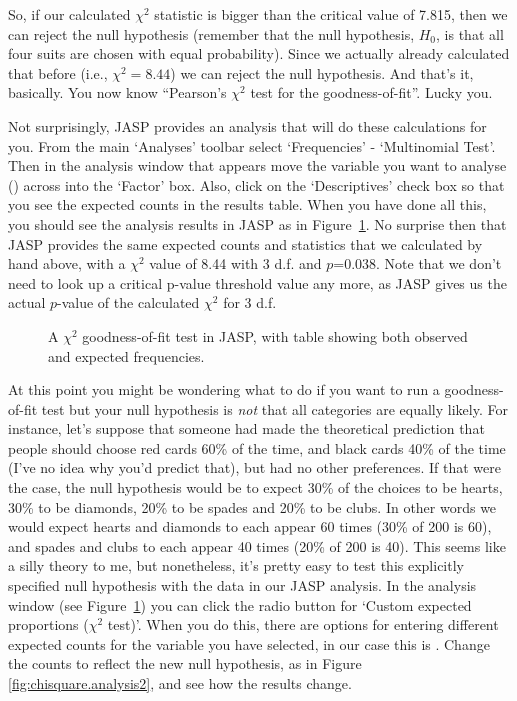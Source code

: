So, if our calculated $\chi^2$ statistic is bigger than the critical value of 7.815, then we can reject the null hypothesis (remember that the null hypothesis, $H_0$, is that all four suits are chosen with equal probability). Since we actually already calculated that before (i.e., $\chi^2 = 8.44$) we can reject the null hypothesis.  And that's it, basically. You now know ``Pearson's $\chi^2$ test for the goodness-of-fit''. Lucky you.


Not surprisingly, JASP provides an analysis that will do these calculations for you. From the main `Analyses' toolbar select `Frequencies' - `Multinomial Test'. Then in the analysis window that appears move the variable you want to analyse () across into the `Factor' box. Also, click on the `Descriptives' check box so that you see the expected counts in the results table. When you have done all this, you should see the analysis results in JASP as in Figure~\ref{fig:chisquare.analysis1}. No surprise then that JASP provides the same expected counts and statistics that we calculated by hand above, with a $\chi^2$ value of 8.44 with 3 d.f. and $p$=0.038. Note that we don't need to look up a critical p-value threshold value any more, as JASP gives us the actual $p$-value of the calculated $\chi^2$ for 3 d.f.  

\begin{figure}
\begin{center}
\caption{A $\chi^2$ goodness-of-fit test in JASP, with table showing both observed and expected frequencies.}
\label{fig:chisquare.analysis1}
\HR
\end{center}
\end{figure}


At this point you might be wondering what to do if you want to run a goodness-of-fit test but your null hypothesis is {\it not} that all categories are equally likely. For instance, let's suppose that someone had made the theoretical prediction that people should choose red cards 60\% of the time, and black cards 40\% of the time (I've no idea why you'd predict that), but had no other preferences. If that were the case, the null hypothesis would be to expect 30\% of the choices to be hearts, 30\% to be diamonds, 20\% to be spades and 20\% to be clubs. In other words we would expect hearts and diamonds to each appear 60 times (30\% of 200 is 60), and spades and clubs to each appear 40 times (20\% of 200 is 40). This seems like a silly theory to me, but nonetheless, it's pretty easy to test this explicitly specified null hypothesis with the data in our JASP analysis. In the analysis window (see Figure~\ref{fig:chisquare.analysis1}) you can click the radio button for `Custom expected proportions ($\chi^2$ test)'. When you do this, there are options for entering different expected counts for the variable you have selected, in our case this is . Change the counts to reflect the new null hypothesis, as in Figure~ \ref{fig:chisquare.analysis2}, and see how the results change. 

